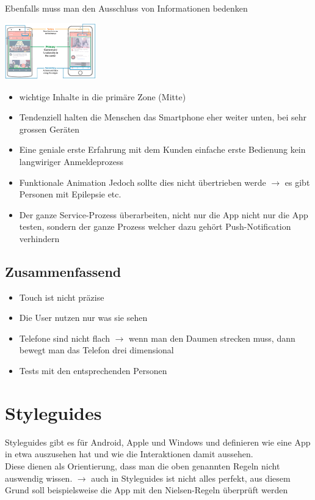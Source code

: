 \documentclass{report}
\newenvironment{Figure}
	{\par\medskip\noindent\minipage{\linewidth}}
	{\endminipage\par\medskip}
\theoremstyle{definition}
\theoremstyle{example}
\begin{document}
Ebenfalls muss man den Ausschluss von Informationen bedenken
\begin{Figure}
   \centering
    \includegraphics[width=150px]{img/occlusion.png}
        \label{fig:Bereichseinteilung}
\end{Figure}
\begin{itemize}
   \item wichtige Inhalte in die primäre Zone (Mitte)
   \item Tendenziell halten die Menschen das Smartphone eher weiter unten, bei sehr grossen Geräten
\end{itemize}

\begin{itemize}
   \item Eine geniale erste Erfahrung mit dem Kunden
   \subitem einfache erste Bedienung
   \subitem kein langwiriger Anmeldeprozess 
   \item Funktionale Animation
   \subitem Jedoch sollte dies nicht übertrieben werde $\rightarrow$ es gibt Personen mit Epilepsie etc. 
   \item Der ganze Service-Prozess überarbeiten, nicht nur die App
   \subitem nicht nur die App testen, sondern der ganze Prozess welcher dazu gehört
   \subitem Push-Notification verhindern 
\end{itemize}

\subsection{Zusammenfassend}
\begin{itemize}
   \item Touch ist nicht präzise
   \item Die User nutzen nur was sie sehen
   \item Telefone sind nicht flach $\rightarrow$ wenn man den Daumen strecken muss, dann bewegt man das Telefon drei dimensional
   \item Tests mit den entsprechenden Personen
\end{itemize}

\section{Styleguides}
Styleguides gibt es für Android, Apple und Windows und definieren wie eine App in etwa auszusehen hat und wie die Interaktionen damit aussehen.\\
Diese dienen als Orientierung, dass man die oben genannten Regeln nicht auswendig wissen. 
$\rightarrow$ auch in Styleguides ist nicht alles perfekt, aus diesem Grund soll beispielsweise die App mit den Nielsen-Regeln überprüft werden
\end{document}
